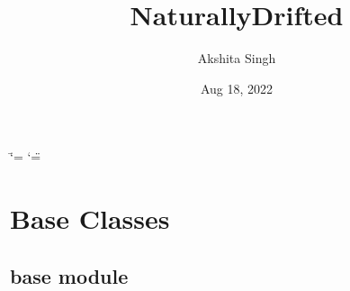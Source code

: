 \documentclass[letterpaper,10pt,english]{sphinxmanual}
\title{NaturallyDrifted}
\date{Aug 18, 2022}
\author{Akshita Singh}
\begin{document}
\ifdefined\shorthandoff
  \ifnum\catcode`\=\string=\active\shorthandoff{=}\fi
  \ifnum\catcode`\"=\active{}\fi
\fi

\pagestyle{empty}
\sphinxmaketitle
\pagestyle{plain}
\sphinxtableofcontents
\pagestyle{normal}
\label{\detokenize{index::doc}}


\sphinxstepscope


\chapter{Base Classes}
\label{\detokenize{baseModules/modules:base-classes}}\label{\detokenize{baseModules/modules::doc}}
\sphinxstepscope


\section{base module}
\label{\detokenize{baseModules/base:module-base}}\label{\detokenize{baseModules/base:base-module}}\label{\detokenize{baseModules/base::doc}}
\end{document}
